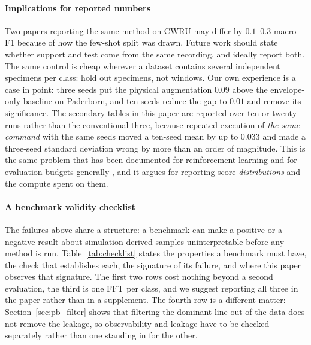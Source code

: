 \documentclass[preprint,12pt]{elsarticle}
\begin{document}
\paragraph{Implications for reported numbers} Two papers reporting the same
method on CWRU may differ by $0.1$--$0.3$ macro-F1 because of how the few-shot
split was drawn. Future work should state whether support and test
come from the same recording, and ideally report both. The same control is
cheap wherever a dataset contains several independent specimens per class: hold
out specimens, not windows. Our own experience is a case in point: three seeds
put the physical augmentation $0.09$ above the envelope-only baseline on
Paderborn, and ten seeds reduce the gap to $0.01$ and remove its significance.
The secondary tables in this paper are reported over ten or twenty runs
rather than the conventional three, because repeated execution of \emph{the same
command} with the same seeds moved a ten-seed mean by up to $0.033$ and made a
three-seed standard deviation wrong by more than an order of magnitude. This is
the same problem that has been documented for reinforcement learning
\cite{henderson2018matters} and for evaluation budgets generally
\cite{dodge2019showyourwork}, and it argues for reporting score
\emph{distributions} and the compute spent on them.

\paragraph{A benchmark validity checklist} The failures above share a
structure: a benchmark can make a positive or a negative result about
simulation-derived samples uninterpretable before any method is run.
Table~\ref{tab:checklist} states the properties a benchmark must have, the check
that establishes each, the signature of its failure, and where this paper
observes that signature. The first two rows cost nothing beyond a second
evaluation, the third is one FFT per class, and we suggest reporting all three
in the paper rather than in a supplement. The fourth row is a different matter:
Section~\ref{sec:pb_filter} shows that filtering the dominant line out of the
data does not remove the leakage, so observability and leakage have to be
checked separately rather than one standing in for the other.
\end{document}
